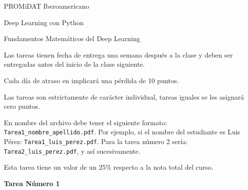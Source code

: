 \documentclass[spanish,12pt]{report}
\begin{document}
\textsf{PROMiDAT Iberoamericano}

\textsf{Deep Learning con Python}

\textsf{Fundamentos Matemáticos del Deep Learning}

\begin{itemize}
{\color{Blue}
\item  Las tareas tienen fecha de entrega una semana después a la clase y deben ser entregadas antes del inicio de la clase siguiente.
\item  Cada día de atraso en implicará una pérdida de 10 puntos.
\item  Las tareas son estrictamente de carácter individual, tareas iguales se les asignará cero puntos.
\item  En nombre del archivo debe tener el siguiente formato: {\tt Tarea1\_nombre\_apellido.pdf}. Por ejemplo, si el nombre del estudiante es Luis Pérez: {\tt Tarea1\_luis\_perez.pdf}. Para la tarea número 2 sería: {\tt Tarea2\_luis\_perez.pdf}, y así sucesivamente.
\item Esta tarea tiene un valor de un 25\% respecto a la nota total del curso.
}
\end{itemize}

\begin{center}
{\color{Red} \textbf{\LARGE\sc Tarea Número 1}}
\end{center}
\end{document}
